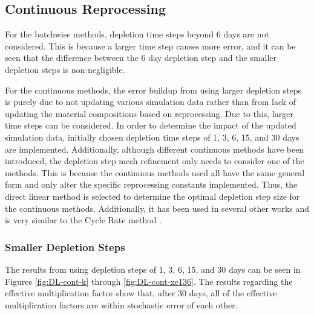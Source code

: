 \subsection{Continuous Reprocessing}

For the batchwise methods, depletion time steps beyond 6 days are not considered. This is because a larger time step causes more error, and it can be seen that the difference between the 6 day depletion step and the smaller depletion steps is non-negligible.

For the continuous methods, the error buildup from using larger depletion steps is purely due to not updating various simulation data rather than from lack of updating the material compositions based on reprocessing. Due to this, larger time steps can be considered. In order to determine the impact of the updated simulation data, initially chosen depletion time steps of 1, 3, 6, 15, and 30 days are implemented. Additionally, although different continuous methods have been introduced, the depletion step mesh refinement only needs to consider one of the methods. This is because the continuous methods used all have the same general form and only alter the specific reprocessing constants implemented. Thus, the direct linear method is selected to determine the optimal depletion step size for the continuous methods. Additionally, it has been used in several other works and is very similar to the Cycle Rate method \cite{xia_development_2019, nuttin_potential_2005, zhou_fuel_2018}.

\subsubsection{Smaller Depletion Steps}

The results from using depletion steps of 1, 3, 6, 15, and 30 days can be seen in Figures \ref{fig:DL-cont-k} through \ref{fig:DL-cont-xe136}. The results regarding the effective multiplication factor show that, after 30 days, all of the effective multiplication factors are within stochastic error of each other. 

